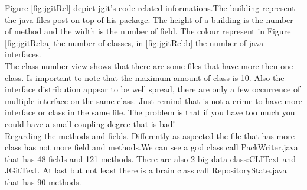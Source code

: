 \documentclass[]{usiinfbachelorproject}
\begin{document}
Figure \ref{fig:jgitRel} depict jgit's code related  informations.The building represent the java files post on top of his package. The height of a building is the number of method and the width is the number of field. The colour represent in Figure \ref{fig:jgitRel:a} the number of classes, in \ref{fig:jgitRel:b} the number of java interfaces.\\
The class number view shows that there are some files that have more then one class. Is important to note that the maximum amount of class is 10. Also the interface distribution appear to be well spread, there are only a few occurrence of multiple interface on the same class. Just remind that is not a crime to have more interface or class in the same file. The problem is that if you have too much you could have a small coupling degree that is bad! \\
Regarding the methods and  fields. Differently as aspected the file that has more class has not more field and methods.We can see a god class call PackWriter.java that has 48 fields and 121 methods. There are also 2 big data class:CLIText and JGitText. At last but not least there is a brain class call RepositoryState.java that has 90 methods.
 


 
\end{document}
